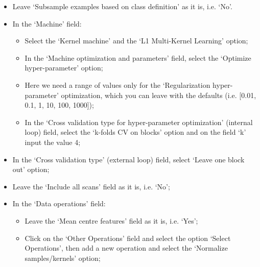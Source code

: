 \begin{itemize}
\begin{itemize}
		\item In the `Subjects' field, type `1' (only subject 1 is selected);
		
		\item In the `Conditions / Scans' field, select the `Specify Conditions' option and add a new condition. Provide a name for this condition, i.e. for Class (1) `Faces' and for Class (2) `Houses'. Note that this name needs to be spelled exactly as specified in the `Data \& Design' module: if you simply loaded an `SPM.mat' file for the design, you {\it must} know the names of the conditions;
		
		\end{itemize}

        \item Leave `Subsample examples based on class definition' as it is, i.e. `No'.


	\item In the `Machine' field:
	
	\begin{itemize}
	
	\item Select the `Kernel machine' and the `L1 Multi-Kernel Learning' option;	
	
	\item In the `Machine optimization and parameters' field, select the `Optimize hyper-parameter' option;
	
	\item Here we need a range of values only for the `Regularization hyper-parameter' optimization, which you can leave with the defaults (i.e. [0.01, 0.1, 1, 10, 100, 1000]);
	
	\item In the `Cross validation type for hyper-parameter optimization' (internal loop) field, select the `k-folds CV on blocks' option and on the field `k' input the value 4;
	
	\end{itemize}
	
	\item In the `Cross validation type' (external loop) field, select `Leave one block out' option;
	
	\item Leave the `Include all scans' field as it is, i.e. `No';

	\item In the `Data operations' field:
	
		\begin{itemize}
		\item  Leave the `Mean centre features' field as it is, i.e. `Yes'; 
				
		\item  Click on the `Other Operations' field and select the option `Select Operations', then add a new operation and select the `{\color{black}Normalize samples/kernels'} option;
		\end{itemize}
	
\end{itemize}

